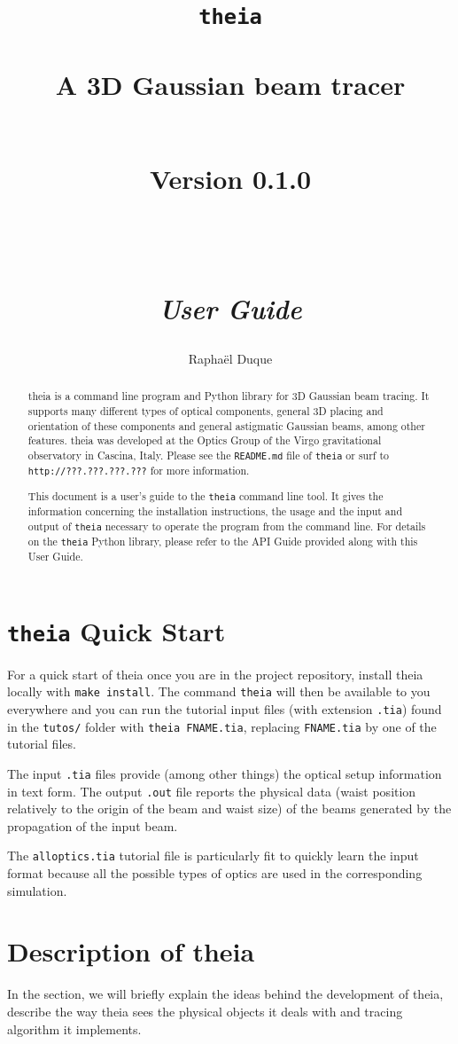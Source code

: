 \documentclass{article}
\title{\texttt{theia} \\ \quad \\A 3D Gaussian beam tracer \\ \quad \\ \begin{small} Version 0.1.0 \end{small} \\ \quad \\ \textit{User Guide}}
\author{Rapha\"el Duque}
\renewcommand{\tt}[1]{\texttt{#1}}
\begin{document}
\maketitle

\begin{abstract}
theia is a command line program and Python library for 3D Gaussian beam tracing. It supports many different types of optical components, general 3D placing and orientation of these components and general astigmatic Gaussian beams, among other features. theia was developed at the Optics Group of the Virgo gravitational observatory in Cascina, Italy. Please see the \tt{README.md} file of \tt{theia} or surf to \tt{http://???.???.???.???} for more information.

This document is a user's guide to the \texttt{theia} command line tool. It gives the information concerning the installation instructions, the usage and the input and output of \texttt{theia} necessary to operate the program from the command line. For details on the \texttt{theia} Python library, please refer to the API Guide provided along with this User Guide.
\end{abstract}


\tableofcontents
\newpage

\section{\texttt{theia} Quick Start}
For a quick start of theia once you are in the project repository, install theia locally with \texttt{make install}. The command \tt{theia} will then be available to you everywhere and  you can run the tutorial input files (with extension \texttt{.tia}) found in the \texttt{tutos/} folder with \texttt{theia FNAME.tia}, replacing \texttt{FNAME.tia} by one of the tutorial files.

The input \tt{.tia} files provide (among other things) the optical setup information in text form. The output \tt{.out} file reports the physical data (waist position relatively to the origin of the beam and waist size) of the beams generated by the propagation of the input beam.

The \tt{alloptics.tia} tutorial file is particularly fit to quickly learn the input format because all the possible types of optics are used in the corresponding simulation. 

\section{Description of theia}
In the section, we will briefly explain the ideas behind the development of theia, describe the way theia sees the physical objects it deals with and tracing algorithm it implements.
\end{document}
